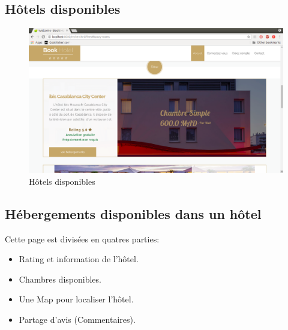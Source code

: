 \documentclass[12pt,a4paper]{report}
\begin{document}
	\subsection{Hôtels disponibles}
	\vspace{2cm}
	\begin{figure}[!hbtp]
		\centering
		\includegraphics[scale=0.3]{./graphics/offres.png}
		\caption{Hôtels disponibles}
		\end{figure}
		\newpage
	
	\subsection{Hébergements disponibles dans un hôtel}
Cette page est divisées en quatres parties:
	\begin{itemize}
	 		\item Rating et information de l'hôtel.
			\item Chambres disponibles.
			\item Une Map pour localiser l'hôtel.
			\item Partage d'avis (Commentaires).
		\end{itemize}
	
\end{document}
